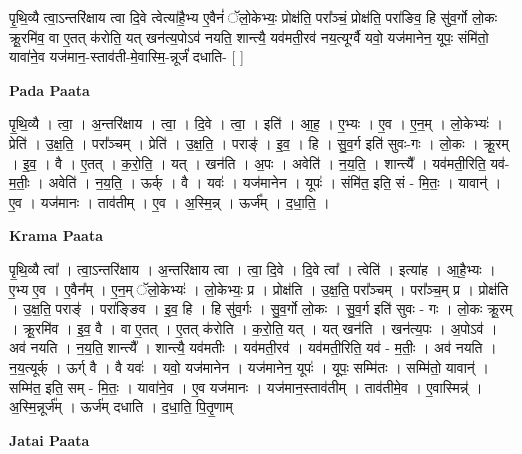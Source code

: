 \documentclass[17pt]{extarticle}
\begin{document}
पृ॒थि॒व्यै त्वा॒ऽन्तरि॑क्षाय त्वा दि॒वे त्वेत्या॑है॒भ्य ए॒वैनं॑ ॅलो॒केभ्यः॒ प्रोक्ष॑ति॒ परा᳚ञ्चं॒ प्रोक्ष॑ति॒ परा॑ङिव॒ हि सु॑व॒र्गो लो॒कः क्रू॒रमि॑व॒ वा ए॒तत् क॑रोति॒ यत् खन॑त्य॒पोऽव॑ नयति॒ शान्त्यै॒ यव॑मती॒रव॑ नय॒त्यूर्ग्वै यवो॒ यज॑मानेन॒ यूपः॒ संमि॑तो॒ यावा॑ने॒व यज॑मान॒-स्ताव॑ती-मे॒वास्मि॒-न्नूर्जं॑ दधाति- [  ] \newline

\textbf{Pada Paata} \newline

पृ॒थि॒व्यै । त्वा॒ । अ॒न्तरि॑क्षाय । त्वा॒ । दि॒वे । त्वा॒ । इति॑ । आ॒ह॒ । ए॒भ्यः । ए॒व । ए॒न॒म् । लो॒केभ्यः॑ । प्रेति॑ । उ॒क्ष॒ति॒ । परा᳚ञ्चम् । प्रेति॑ । उ॒क्ष॒ति॒ । पराङ्॑ । इ॒व॒ । हि । सु॒व॒र्ग इति॑ सुवः-गः । लो॒कः । क्रू॒रम् । इ॒व॒ । वै । ए॒तत् । क॒रो॒ति॒ । यत् । खन॑ति । अ॒पः । अवेति॑ । न॒य॒ति॒ । शान्त्यै᳚ । यव॑मती॒रिति॒ यव॑-म॒तीः॒ । अवेति॑ । न॒य॒ति॒ । ऊर्क् । वै । यवः॑ । यज॑मानेन । यूपः॑ । संमि॑त॒ इति॒ सं - मि॒तः॒ । यावान्॑ । ए॒व । यज॑मानः । ताव॑तीम् । ए॒व । अ॒स्मि॒न्न् । ऊर्ज᳚म् । द॒धा॒ति॒ ।  \newline


\textbf{Krama Paata} \newline

पृ॒थि॒व्यै त्वा᳚ । त्वा॒ऽन्तरि॑क्षाय । अ॒न्तरि॑क्षाय त्वा । त्वा॒ दि॒वे । दि॒वे त्वा᳚ । त्वेति॑ । इत्या॑ह । आ॒है॒भ्यः । ए॒भ्य ए॒व । ए॒वैन᳚म् । ए॒न॒म् ॅलो॒केभ्यः॑ । लो॒केभ्यः॒ प्र । प्रोक्ष॑ति । उ॒क्ष॒ति॒ परा᳚ञ्चम् । परा᳚ञ्च॒म् प्र । प्रोक्ष॑ति । उ॒क्ष॒ति॒ पराङ्॑ । परा॑ङ्‍ङिव । इ॒व॒ हि । हि सु॑व॒र्गः । सु॒व॒र्गो लो॒कः । सु॒व॒र्ग इति॑ सुवः - गः । लो॒कः क्रू॒रम् । क्रू॒रमि॑व । इ॒व॒ वै । वा ए॒तत् । ए॒तत् क॑रोति । क॒रो॒ति॒ यत् । यत् खन॑ति । खन॑त्य॒पः । अ॒पोऽव॑ । अव॑ नयति । न॒य॒ति॒ शान्त्यै᳚ । शान्त्यै॒ यव॑मतीः । यव॑मती॒रव॑ । यव॑मती॒रिति॒ यव॑ - म॒तीः॒ । अव॑ नयति । न॒य॒त्यूर्क् । ऊर्ग् वै । वै यवः॑ । यवो॒ यज॑मानेन । यज॑मानेन॒ यूपः॑ । यूपः॒ सम्मि॑तः । सम्मि॑तो॒ यावान्॑ । सम्मि॑त॒ इति॒ सम् - मि॒तः॒ । यावा॑ने॒व । ए॒व यज॑मानः । यज॑मान॒स्ताव॑तीम् । ताव॑तीमे॒व । ए॒वास्मिन्न्॑ । अ॒स्मि॒न्नूर्ज᳚म् । ऊर्ज॑म् दधाति । द॒धा॒ति॒ पि॒तृ॒णाम् \newline

\textbf{Jatai Paata} \newline
\end{document}
